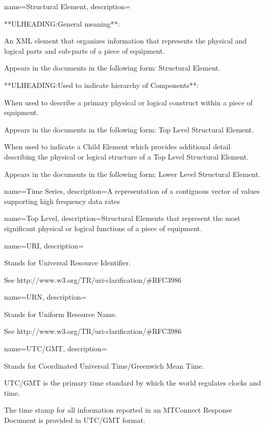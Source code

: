 {
    name={Structural Element},
	description={
	**ULHEADING:General meaning**:

	An XML element that organizes information that represents the physical and logical parts and sub-parts of a piece of equipment.

	Appears in the documents in the following form: \gls{Structural Element}.

	**ULHEADING:Used to indicate hierarchy of Components**:

	When used to describe a primary physical or logical construct within a piece of equipment. 

	Appears in the documents in the following form: \gls{Top Level} \gls{Structural Element}.

	When used to indicate a \gls{Child Element} which provides additional detail describing the physical or logical structure of a \gls{Top Level} \gls{Structural Element}.

	Appears in the documents in the following form: \gls{Lower Level} \gls{Structural Element}.
}
}

{
    name={Time Series},
	description={A  representation of a contiguous vector of values supporting high frequency data rates}
}

{
    name={Top Level},
	description={\gls{Structural Elements} that represent the most significant physical or logical functions of a piece of equipment.}
}

{
    name={URI},
	description={
	Stands for Universal Resource Identifier.  

	See http://www.w3.org/TR/uri-clarification/#RFC3986  
}
}

{
    name={URN},
	description={
	Stands for Uniform Resource Name.  

	See http://www.w3.org/TR/uri-clarification/#RFC3986  
}
}

{
    name={UTC/GMT},
	description={
	Stands for Coordinated Universal Time/Greenwich Mean Time.  

	UTC/GMT is the primary time standard by which the world regulates clocks and time.

	The time stamp for all information reported in an \gls{MTConnect Response Document} is provided in UTC/GMT format.
}
}

